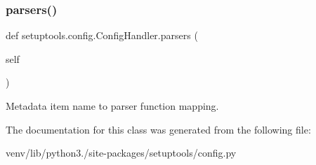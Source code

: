 \subsubsection{\texorpdfstring{parsers()}{parsers()}}
{\footnotesize\ttfamily def setuptools.\+config.\+Config\+Handler.\+parsers (\begin{DoxyParamCaption}\item[{}]{self }\end{DoxyParamCaption})}

\begin{DoxyVerb}Metadata item name to parser function mapping.\end{DoxyVerb}
 

The documentation for this class was generated from the following file\+:\begin{DoxyCompactItemize}
\item 
venv/lib/python3./site-\/packages/setuptools/config.\+py\end{DoxyCompactItemize}
